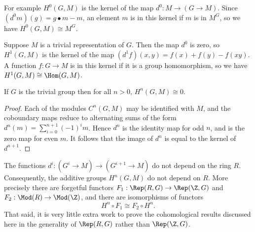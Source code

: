 \begin{example} \label{eg:H0}
	For example $H^0(G,M)$ is the kernel of the map $d^0 : M \to (G \to M)$.
	Since $(d^0m)(g) = g \bullet m - m$, an element $m$ is in this kernel if $m$ is in $M^G$,
	so we have $H^0(G,M) \cong M^G$.
\end{example}

\begin{example} \label{eg:H1 trivial iso Hom}
	Suppose $M$ is a trivial representation of $G$. Then the map $d^0$ is zero,
	so $H^1(G,M)$ is the kernel of the map $(d^1f)(x,y) = f(x) + f(y) - f(xy)$.
	A function $f: G \to M$ is in this kernel if it is a group homomorphism, so we have
	$H^1(G,M) \cong \Hom(G,M)$.
\end{example}

\begin{lemma} \label{lem:Hn unit}
	If $G$ is the trivial group then for all $n>0$, $H^n(G,M)\cong 0$.
\end{lemma}

\begin{proof}
	Each of the modules $C^n(G,M)$ may be identified with $M$,
	and the coboundary maps reduce to alternating sums of the form
	$d^n(m) = \sum_{i=0}^{n+1} (-1)^i m$.
	Hence $d^n$ is the identity map for odd $n$, and is the zero map for even $m$.
	It follows that the image of $d^n$ is equal to the kernel of $d^{n+1}$.
\end{proof}

\begin{remark}
	The functions $d^i : (G^i \to M) \to (G^{i+1} \to M)$ do not depend on the
	ring $R$. Consequently, the additive groups $H^n(G,M)$ do not depend on $R$.
	More precisely there are forgetful functors $F_1 : \Rep(R,G) \to \Rep(\Z,G)$
	and $F_2 : \Mod(R) \to \Mod(\Z)$, and there are isomorphisms of functors
	\[
		H^n \circ F_1 \cong F_2 \circ H^n.
	\]
	That said, it is very little extra work to prove the cohomological results
	discussed here in the generality of $\Rep(R,G)$ rather than $\Rep(\Z,G)$.
\end{remark}


